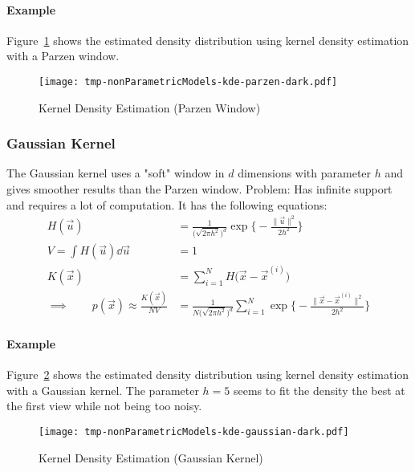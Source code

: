 				\paragraph{Example}
					Figure~\ref{fig:kdeParzen} shows the estimated density distribution using kernel density estimation with a Parzen window.

					\begin{figure} 
						\centering
						\texttt{[image: tmp-nonParametricModels-kde-parzen-dark.pdf]}
						\caption{Kernel Density Estimation (Parzen Window)}
						\label{fig:kdeParzen}
					\end{figure}

			\subsubsection{Gaussian Kernel}
				The Gaussian kernel uses a "soft" window in \(d\) dimensions with parameter \(h\) and gives smoother results than the Parzen window. Problem: Has infinite support and requires a lot of computation. It has the following equations:
				\begin{align}
					H(\vec{u}) &= \frac{1}{\big(\sqrt{2 \pi h^2}\big)^d} \exp\Bigg\{ -\frac{\lVert \vec{u} \rVert^2}{2h^2} \Bigg\} \\
					V = \int H(\vec{u}) \dd{\vec{u}} &= 1 \\
					K(\vec{x}) &= \sum_{i = 1}^{N} H\big(\vec{x} - \vec{x}^{(i)}\big) \\
					\implies\qquad p(\vec{x}) \approx \frac{K(\vec{x})}{NV} &= \frac{1}{N\big(\sqrt{2 \pi h^2}\big)^d} \sum_{i = 1}^{N} \exp\Bigg\{ -\frac{\lVert \vec{x} - \vec{x}^{(i)} \rVert^2}{2h^2} \Bigg\}
				\end{align}

				\paragraph{Example}
					Figure~\ref{fig:kdeGaussian} shows the estimated density distribution using kernel density estimation with a Gaussian kernel. The parameter \( h = 5 \) seems to fit the density the best at the first view while not being too noisy.

					\begin{figure}
						\centering
						\texttt{[image: tmp-nonParametricModels-kde-gaussian-dark.pdf]}
						\caption{Kernel Density Estimation (Gaussian Kernel)}
						\label{fig:kdeGaussian}
					\end{figure}

